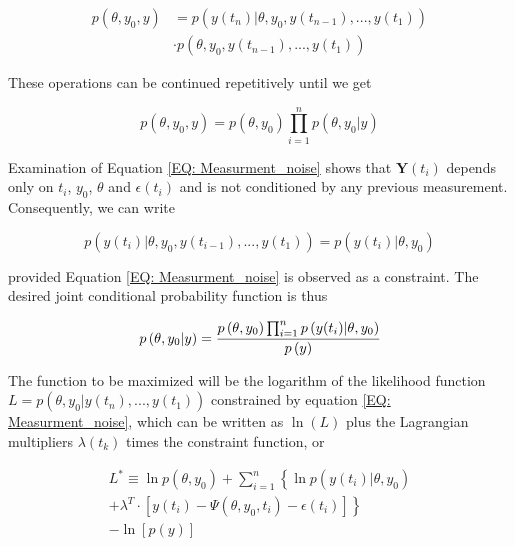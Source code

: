 \documentclass[a4paper,fleqn]{cas-dc}
\begin{document}
{\footnotesize
\begin{equation}
	\begin{split}
		p\left( \theta,y_0,y \right) &= p\left( y(t_n)|\theta,y_0,y(t_{n-1}),...,y(t_1) \right) \\ &\cdot p\left( \theta,y_0,y(t_{n-1}),...,y(t_1) \right)
	\end{split}
\end{equation} }

These operations can be continued repetitively until we get

{\footnotesize
\begin{equation}
	p\left( \theta,y_0,y \right) = p\left( \theta,y_0 \right) \prod_{i=1}^{n} p\left( \theta,y_0|y \right)
\end{equation} }

Examination of Equation \ref{EQ: Measurment_noise} shows that $\textbf{Y}(t_i)$ depends only on $t_i$, $y_0$, $\theta$ and $\epsilon(t_i)$ and is not conditioned by any previous measurement. Consequently, we can write 

{\footnotesize
\begin{equation}
	p\left( y(t_i)|\theta,y_0, y(t_{i-1}),...,y(t_1) \right) = p\left( y(t_i)|\theta,y_0 \right)
\end{equation} }

provided Equation \ref{EQ: Measurment_noise} is observed as a constraint. The desired joint conditional probability function is thus

{\footnotesize
\begin{equation}
	p\left( \theta,y_0|y \right) = \cfrac{p\left( \theta,y_0 \right) \prod_{i=1}^{n} p\left( y(t_i)|\theta,y_0 \right) }{p\left( y \right)}
\end{equation} }

The function to be maximized will be the logarithm of the likelihood function $L = p\left( \theta,y_0| y(t_n),...,y(t_1) \right)$ constrained by equation \ref{EQ: Measurment_noise}, which can be written as $\ln(L)$ plus the Lagrangian multipliers $\lambda(t_k)$ times the constraint function, or

{\footnotesize
\begin{equation} \label{EQ: MLE_Lagrangian}
	\begin{split}
		L^* \equiv \ln p\left( \theta,y_0 \right) + \sum_{i=1}^{n} \left\{ \ln p(y(t_i)|\theta,y_0) \right. \\
		\left. + \lambda^T \cdot \left[ y(t_i) - \Psi\left( \theta,y_0,t_i \right) - \epsilon(t_i) \right] \right\} \\ - \ln \left[ p\left( y \right) \right]
	\end{split}
\end{equation}}
\end{document}
